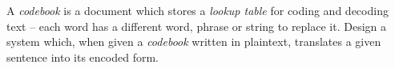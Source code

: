 
\vspace*{-1cm}

\problem A \textit{codebook} is a document which stores a \textit{lookup table} for coding and decoding text --
each word has a different word, phrase or string to replace it.
Design a system which, when given a \textit{codebook} written in plaintext, translates a given sentence into its encoded form.

\solution
